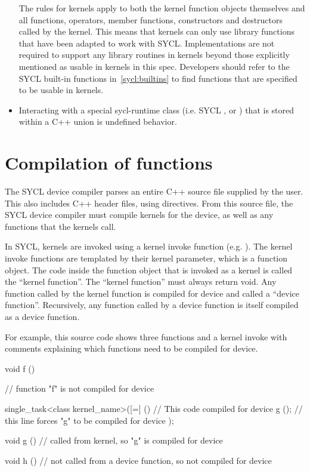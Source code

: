 \begin{itemize}
    The rules for kernels apply to both the kernel function objects themselves
    and all functions, operators, member functions, constructors and destructors
    called by the kernel. This means that kernels can only use library functions
    that have been adapted to work with SYCL. Implementations are not required
    to support any library routines in kernels beyond those explicitly mentioned
    as usable in kernels in this spec. Developers should refer to the SYCL
    built-in functions in~\ref{sycl:builtins} to find functions that are
    specified to be usable in kernels.
  \item
     Interacting with a special \gls{sycl-runtime} class (i.e. SYCL ,  or ) that is stored within a C++ union is undefined behavior.
\end{itemize}

\section{Compilation of functions}

The SYCL device compiler parses an entire C++ source file supplied by the user.
This also includes C++ header files, using  directives. From this
source file, the SYCL device compiler must compile kernels for the device, as
well as any functions that the kernels call.

In SYCL, kernels are invoked using a kernel invoke function (e.g.
). The kernel invoke functions are templated by their
kernel parameter, which is a function object.
The code inside the function object that is invoked as a kernel is called
the ``kernel function''. The ``kernel function'' must always return void. Any
function called by the kernel function is compiled for device and called a
``device function''. Recursively, any function called by a device function is
itself compiled as a device function.

For example, this source code shows three functions and a kernel invoke with
comments explaining which functions need to be compiled for device.

\begin{code}
void f ()
{
    // function "f" is not compiled for device

    single_task<class kernel_name>([=] ()
        {
            // This code compiled for device
            g (); // this line forces "g" to be compiled for device
        });
}

void g ()
{
    // called from kernel, so "g" is compiled for device
}

void h ()
{
    // not called from a device function, so not compiled for device
}
\end{code}

